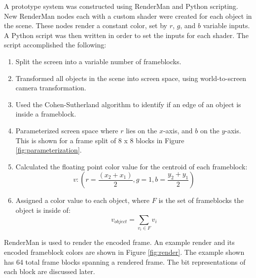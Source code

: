\documentclass[conference]{IEEEtran}
\begin{document}
A prototype system was constructed using RenderMan
and Python scripting.
New RenderMan nodes each with a custom shader were created for each object in the scene.
These nodes render a constant color, set by $r$, $g$, and $b$ variable inputs.
A Python script was then written in order to set the inputs for each shader.
The script accomplished the following:
\bigskip
\begin{enumerate}
\item Split the screen into a variable number of frameblocks.
\item Transformed all objects in the scene into screen space, using world-to-screen camera transformation.
\item Used the Cohen-Sutherland algorithm to identify if an edge of an object is inside a frameblock.
\item Parameterized screen space where $r$ lies on the $x$-axis, and $b$ on the $y$-axis.
This is shown for a frame split of 8 x 8 blocks in Figure \ref{fig:parameterization}.
\item Calculated the floating point color value for the centroid of each frameblock:
$$v : (r=\frac{(x_2 + x_1)}{2}, g=1, b=\frac{y_2 + y_1}{2})$$
\item Assigned a color value to each object, where
$F$ is the set of frameblocks the object is inside of:
$$v_{object} = \sum_{v_i\in F}v_i$$
\end{enumerate}
\bigskip
RenderMan is used to render the encoded frame.
An example render and its encoded frameblock colors are shown in Figure \ref{fig:render}.
The example shown has 64 total frame blocks spanning a rendered frame.
The bit representations of each block are discussed later.
\end{document}
